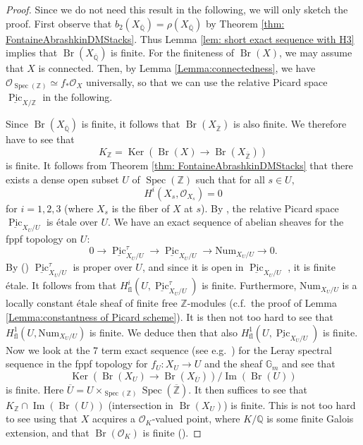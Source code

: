 \documentclass{amsart}
\theoremstyle{definition}
\theoremstyle{remark}
\DeclareMathOperator{\Ker}{Ker}
\DeclareMathOperator{\Image}{Im}
\DeclareMathOperator{\Spec}{Spec}
\DeclareMathOperator{\Br}{Br}
\DeclareMathOperator{\Pic}{Pic}
\newcommand{\Q}{\mathbb{Q}}
\newcommand{\ZZ}{\mathbb Z}
\newcommand{\QQ}{\mathbb Q}
\begin{document}
\begin{proof}
Since we do not need this result in the following, we will only sketch the proof.
First observe that
$b_{2}(X_{\overline{\QQ}})=\rho(X_{\overline{\QQ}})$ by Theorem \ref{thm: FontaineAbrashkinDMStacks}.
Thus Lemma \ref{lem: short exact sequence with H3} implies that
$
\Br(X_{\overline{\QQ}})
$
is finite.
For the finiteness of
$
\Br(X)
$,
we may assume that $X$ is connected.
Then, by Lemma \ref{Lemma:connectedness}, we have $\mathcal{O}_{\Spec(\ZZ)}\simeq f_{*}\mathcal{O}_{X}$ universally, so that we can use the relative Picard space $\underline{\Pic}_{X/\ZZ}$ in the following.

Since $\Br(X_{\overline{\Q}})$ is finite,
it follows that $\Br(X_{\overline{\ZZ}})$ is also finite.
    We therefore have to see that
    $$
    K_{\ZZ}=\Ker(\Br(X)\rightarrow \Br(X_{\overline{\ZZ}}))
    $$
    is finite. 
    It follows from Theorem \ref{thm: FontaineAbrashkinDMStacks} that
    there exists a dense open subset $U$ of $\Spec(\ZZ)$ such that for all
    $s\in U,$
    $$
    H^{i}(X_{s},\mathcal{O}_{X_{s}})=0
    $$
    for $i=1,2,3$ (where $X_s$ is the fiber of $X$ at $s$).
    By \cite[Proposition 3.2, Theorem 3.6]{fringuelli2023picardgroupschememoduli},
    the relative Picard space
    $\underline{\Pic}_{X_{U}/U}$
    is \'etale over $U$.
    We have an exact sequence of abelian sheaves
    for the fppf topology on $U$:
    \[
    0 \to \underline{\Pic}^{\tau}_{X_{U}/U} \to \underline{\Pic}_{X_{U}/U} \to \text{Num}_{X_{U}/U} \to 0.
    \]
    By (\cite[Theorem 3.6 (iv) (b)]{fringuelli2023picardgroupschememoduli}) $\underline{\Pic}^{\tau}_{X_{U}/U}$ is proper over $U$, and since it is open
    in $\underline{\Pic}_{X_{U}/U}$ \cite[Theorem 3.6 (i)]{fringuelli2023picardgroupschememoduli}, it is finite étale.
    It follows from \cite[Theorem 3.1]{MilneDuality} that
    $H^{i}_{\text{fl}}(U,\underline{\Pic}^{\tau}_{X_{U}/U})$ is finite.
    Furthermore, $\text{Num}_{X_{U}/U}$ is a locally constant étale sheaf of finite free $\ZZ$-modules (c.f.\ the proof of Lemma \ref{Lemma:constantness of Picard scheme}).
    It is then not too hard to see that $H^{1}_{\text{fl}}(U,\text{Num}_{X_{U}/U})$ is finite.
    We deduce then that also $H^{1}_{\text{fl}}(U,\underline{\Pic}_{X_{U}/U})$ is finite.
    Now we look at the 7 term exact sequence (see e.g.\ \cite[Appendix B, page 309]{MilneEtCoho}) for the Leray spectral sequence in the fppf topology for $f_{U}\colon X_{U}\rightarrow U$ and the sheaf $\mathbb{G}_{m}$ and see that
    $$
    \Ker(\Br(X_{U})\rightarrow \Br(X_{\overline{U}}))/\Image(\Br(U))
    $$
    is finite. Here $\overline{U}=U\times_{\Spec(\ZZ)}\Spec(\overline{\ZZ}).$ It then suffices to see that $K_{\ZZ}\cap \Image(\Br(U))$ (intersection in $\Br(X_{U})$) is finite. This is not too hard to see using that $X$ acquires a $\mathcal{O}_{K}$-valued point, where $K/\mathbb{Q}$ is some finite Galois extension, and that $\Br(\mathcal{O}_{K})$ is finite (\cite[Proposition 2.4]{GrothendieckGroupedeBrauerIII}).
\end{proof}
\end{document}
